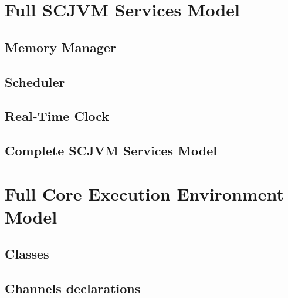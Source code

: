 \documentclass[a4paper,11pt]{report}
\newif\ifFullModel
\newcommand{\IfFullModel}[1]{\ifFullModel #1 \fi}
\newcommand{\IfNotFullModel}[1]{\ifFullModel \else #1 \fi}
\begin{document}








{\raggedright \printbibliography}

\appendix

\chapter{Full SCJVM Services Model}
\label{full-scjvm-services-model}

\FullModeltrue

\section{Memory Manager}


\section{Scheduler}


\section{Real-Time Clock}


\section{Complete SCJVM Services Model}


\chapter{Full Core Execution Environment Model}
\label{full-cee-model}

\section{Classes}


\section{Channels declarations}
\label{cee-model-channels}
\end{document}
